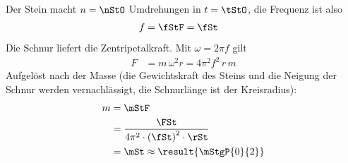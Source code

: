 Der Stein macht $n = \nStO$ Umdrehungen in $t = \tStO$, die Frequenz ist also
\begin{align}
 f &= \fStF = \fSt
\end{align}
Die Schnur liefert die Zentripetalkraft. Mit $\omega = 2\pi f$ gilt
\begin{align}
 F &= m\,\omega^2 r = 4\pi^2 f^2\, r\, m
\end{align}
Aufgelöst nach der Masse (die Gewichtskraft des Steins und die Neigung der Schnur werden vernachlässigt, die Schnurlänge ist der Kreisradius):
\begin{align}
 m &= \mStF \\
   &= \frac{\FSt}{4\pi^2\cdot\left(\fSt\right)^2\cdot\rSt} \\
   &= \mSt \approx \result{\mStgP{0}{2}}
\end{align}
